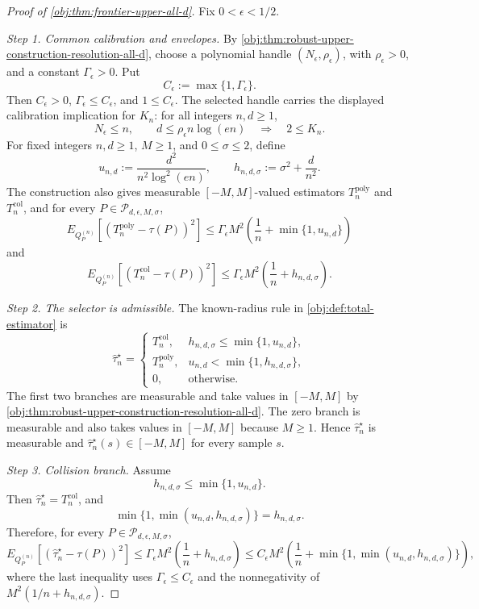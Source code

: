 \documentclass[11pt]{article}
\begin{document}
\begin{proof}[Proof of \cref{obj:thm:frontier-upper-all-d}]
Fix \(0<\epsilon<1/2\).

\emph{Step 1. Common calibration and envelopes.}
By \cref{obj:thm:robust-upper-construction-resolution-all-d}, choose a polynomial handle
\((N_{\epsilon},\rho_{\epsilon})\), with \(\rho_{\epsilon}>0\), and a constant
\(\Gamma_{\epsilon}>0\).  Put
\[
C_{\epsilon}:=\max\{1,\Gamma_{\epsilon}\}.
\]
Then \(C_{\epsilon}>0\), \(\Gamma_{\epsilon}\le C_{\epsilon}\), and
\(1\le C_{\epsilon}\).  The selected handle carries the displayed calibration implication
for \(K_n\): for all integers \(n,d\ge1\),
\[
N_{\epsilon}\le n,
\qquad
d\le \rho_{\epsilon}n\log(en)
\quad\Longrightarrow\quad
2\le K_n .
\]
For fixed integers \(n,d\ge1\), \(M\ge1\), and \(0\le\sigma\le2\), define
\[
u_{n,d}:=\frac{d^2}{n^2\log^2(en)},
\qquad
h_{n,d,\sigma}:=\sigma^2+\frac{d}{n^2}.
\]
The construction also gives measurable \([-M,M]\)-valued estimators
\(T_n^{\mathrm{poly}}\) and \(T_n^{\mathrm{col}}\), and for every
\(P\in\mathcal P_{d,\epsilon,M,\sigma}\),
\[
E_{Q_P^{(n)}}\!\left[
\left(T_n^{\mathrm{poly}}-\tau(P)\right)^2
\right]
\le
\Gamma_{\epsilon}M^2
\left(\frac1n+\min\{1,u_{n,d}\}\right)
\]
and
\[
E_{Q_P^{(n)}}\!\left[
\left(T_n^{\mathrm{col}}-\tau(P)\right)^2
\right]
\le
\Gamma_{\epsilon}M^2
\left(\frac1n+h_{n,d,\sigma}\right).
\] %

\emph{Step 2. The selector is admissible.}
The known-radius rule in \cref{obj:def:total-estimator} is
\[
\widehat\tau_n^{\star}
=
\begin{cases}
T_n^{\mathrm{col}},&
h_{n,d,\sigma}\le \min\{1,u_{n,d}\},\\
T_n^{\mathrm{poly}},&
u_{n,d}<\min\{1,h_{n,d,\sigma}\},\\
0,&\text{otherwise}.
\end{cases}
\]
The first two branches are measurable and take values in \([-M,M]\) by
\cref{obj:thm:robust-upper-construction-resolution-all-d}.  The zero branch is measurable and
also takes values in \([-M,M]\) because \(M\ge1\).  Hence
\(\widehat\tau_n^{\star}\) is measurable and
\(\widehat\tau_n^{\star}(s)\in[-M,M]\) for every sample \(s\). %

\emph{Step 3. Collision branch.}
Assume
\[
h_{n,d,\sigma}\le \min\{1,u_{n,d}\}.
\]
Then \(\widehat\tau_n^{\star}=T_n^{\mathrm{col}}\), and
\[
\min\{1,\min(u_{n,d},h_{n,d,\sigma})\}=h_{n,d,\sigma}.
\]
Therefore, for every \(P\in\mathcal P_{d,\epsilon,M,\sigma}\),
\[
E_{Q_P^{(n)}}\!\left[
\left(\widehat\tau_n^{\star}-\tau(P)\right)^2
\right]
\le
\Gamma_{\epsilon}M^2
\left(\frac1n+h_{n,d,\sigma}\right)
\le
C_{\epsilon}M^2
\left(\frac1n+\min\{1,\min(u_{n,d},h_{n,d,\sigma})\}\right),
\]
where the last inequality uses \(\Gamma_{\epsilon}\le C_{\epsilon}\) and the
nonnegativity of \(M^2(1/n+h_{n,d,\sigma})\). %


\end{proof}
\end{document}
